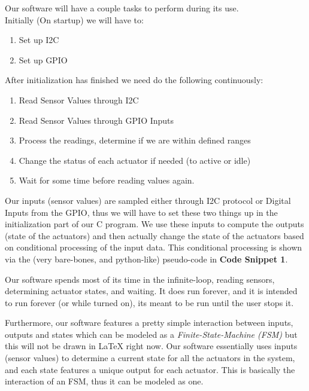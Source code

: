 \documentclass[]{report}
\begin{document}
Our software will have a couple tasks to perform during its use. \\
Initially (On startup) we will have to:
\begin{enumerate}
	\item Set up I2C 
	\item Set up GPIO
\end{enumerate} 
After initialization has finished we need do the following continuously:
\begin{enumerate}
	\item Read Sensor Values through I2C
	\item Read Sensor Values through GPIO Inputs
	\item Process the readings, determine if we are within defined ranges
	\item Change the status of each actuator if needed (to active or idle)
	\item Wait for some time before reading values again.
\end{enumerate}

Our inputs (sensor values) are sampled either through I2C protocol or Digital Inputs from the GPIO, thus we will have to set these two things up in the initialization part of our C program. We use these inputs to compute the outputs (state of the actuators) and then actually change the state of the actuators based on conditional processing of the input data. This conditional processing is shown via the (very bare-bones, and python-like)  pseudo-code in \textbf{Code Snippet 1}.

Our software spends most of its time in the infinite-loop, reading sensors, determining actuator states, and waiting. It does run forever, and it is intended to run forever (or while turned on), its meant to be run until the user stops it.

Furthermore, our software features a pretty simple interaction between inputs, outputs and states which can be modeled as a \textit{Finite-State-Machine (FSM)} \hspace{0.5em}but this will not be drawn in \LaTeX\hspace{0.15em} right now. Our software essentially uses inputs (sensor values) to determine a current state for all the actuators in the system, and each state features a unique output for each actuator. This is basically the interaction of an FSM, thus it can be modeled as one.
\end{document}
